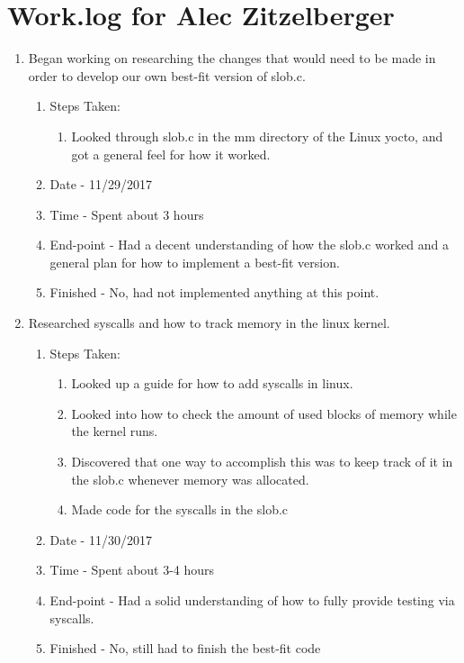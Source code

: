 \documentclass[journal,10pt,onecolumn,compsoc]{IEEEtran} \usepackage[margin=1.0in]{geometry} \usepackage{pdfpages}
\begin{document}
\section {Work.log for Alec Zitzelberger}
\begin{enumerate}
	\item Began working on researching the changes that would need to be made in order to develop our own best-fit version of slob.c.
		\begin{enumerate}
			\item Steps Taken:
				\begin{enumerate}
					\item Looked through slob.c in the mm directory of the Linux yocto, and got a general feel for how it worked.
				\end{enumerate}
			\item Date - 11/29/2017
			\item Time - Spent about 3 hours
			\item End-point - Had a decent understanding of how the slob.c worked and a general plan for how to implement a best-fit version.
			\item Finished - No, had not implemented anything at this point.\\
		\end {enumerate}
        
	\item Researched syscalls and how to track memory in the linux kernel.
		\begin{enumerate}
			\item Steps Taken:
				\begin{enumerate}
					\item Looked up a guide for how to add syscalls in linux.
                    \item Looked into how to check the amount of used blocks of memory while the kernel runs.
                    \item Discovered that one way to accomplish this was to keep track of it in the slob.c whenever memory was allocated.
                    \item Made code for the syscalls in the slob.c
				\end{enumerate}
			\item Date - 11/30/2017
			\item Time - Spent about 3-4 hours
			\item End-point - Had a solid understanding of how to fully provide testing via syscalls.
			\item Finished - No, still had to finish the best-fit code \\
		\end {enumerate}
        

\end{enumerate}
\end{document}

